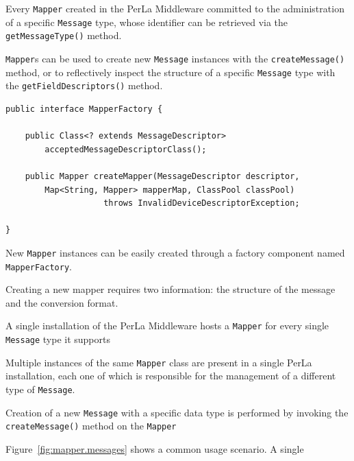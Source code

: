 Every \texttt{Mapper} created in the PerLa Middleware committed to the
administration of a specific \texttt{Message} type, whose identifier can be
retrieved via the \texttt{getMessageType()} method.

\texttt{Mapper}s can be used to create new \texttt{Message} instances with the
\texttt{createMessage()} method, or to reflectively inspect the structure of a
specific \texttt{Message} type with the \texttt{getFieldDescriptors()} method.

\lstset{language=Java}
\begin{lstlisting}[float,floatplacement=!hbt,caption=The Mapper Factory
interface,label={lst:mapperFactory}]
public interface MapperFactory {

    public Class<? extends MessageDescriptor>
        acceptedMessageDescriptorClass();

    public Mapper createMapper(MessageDescriptor descriptor,
        Map<String, Mapper> mapperMap, ClassPool classPool)
                    throws InvalidDeviceDescriptorException;

}
\end{lstlisting}

New \texttt{Mapper} instances can be easily created through a factory component
named \texttt{MapperFactory}.

Creating a new mapper requires two information: the structure of the message
and the conversion format.

A single installation of the PerLa Middleware hosts a \texttt{Mapper} for every
single \texttt{Message} type it supports 

Multiple instances of the same \texttt{Mapper} class are present in a single
PerLa installation, each one of which is responsible for the management of a
different type of \texttt{Message}.

Creation of a new \texttt{Message} with a specific data type is performed by
invoking the \texttt{createMessage()} method on the \texttt{Mapper} 

Figure~\ref{fig:mapper.messages} shows a common usage scenario. A single 















